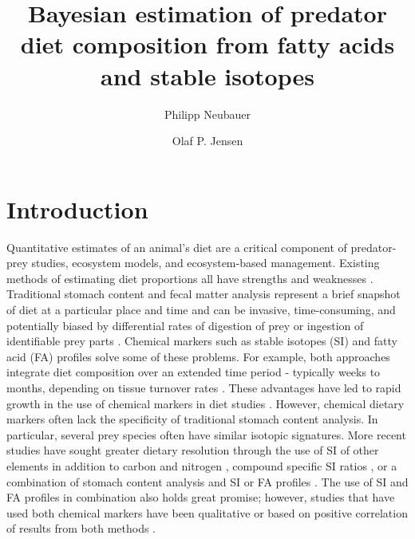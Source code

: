 \documentclass[fleqn,10pt]{wlpeerj}
\title{Bayesian estimation of predator diet composition from fatty
  acids and stable isotopes}
\author[1]{Philipp Neubauer}
\author[2]{Olaf P. Jensen}
\affil[1]{Dragonfly Science, PO Box 27535, Wellington 6141, New Zealand}
\affil[2]{Institute of Marine and Coastal Sciences\\Rutgers University, New Brunswick, NJ 08901, USA}
\begin{document}
\flushbottom
\maketitle
\thispagestyle{empty}

\section*{Introduction}

Quantitative estimates of an animal’s diet are a critical component of
predator-prey studies, ecosystem models, and ecosystem-based
management. Existing methods of estimating diet proportions all have
strengths and weaknesses \citep{bowen_methods_2012}. Traditional
stomach content and fecal matter analysis represent a brief snapshot
of diet at a particular place and time and can be invasive,
time-consuming, and potentially biased by differential rates of
digestion of prey or ingestion of identifiable prey parts
\citep{bowen_methods_2012}. Chemical markers such as stable isotopes
(SI) and fatty acid (FA) profiles solve some of these problems.  For
example, both approaches integrate diet composition over an extended
time period -  typically weeks to months, depending on tissue turnover
rates  \citep{tucker_convergence_2008}. These advantages have led to rapid
growth in the use of chemical markers in diet studies
 \citep{elsdon_unraveling_2010,williams_using_2010,kelly_fatty_2011,
bowen_methods_2012}. However, chemical dietary markers often lack
the specificity of traditional stomach content analysis. In
particular, several prey species often have similar isotopic signatures. More
recent studies have sought greater dietary resolution through the use
of SI of other elements in addition to carbon and
nitrogen \citep[e.g.,][]{belicka_stable_2012}, compound specific SI ratios
\citep[e.g.,][]{budge_tracing_2008,jack_individual_2011}, or a combination of stomach
content analysis and SI or FA profiles \citep[e.g.,][]{pethybridge_seasonal_2012}. The
use of SI and FA profiles in combination also holds great promise; however, studies that have used both chemical markers have been
qualitative \citep[e.g.,][]{guest_trophic_2009} or based on positive correlation
of results from both methods \citep{tucker_convergence_2008}.
\end{document}
